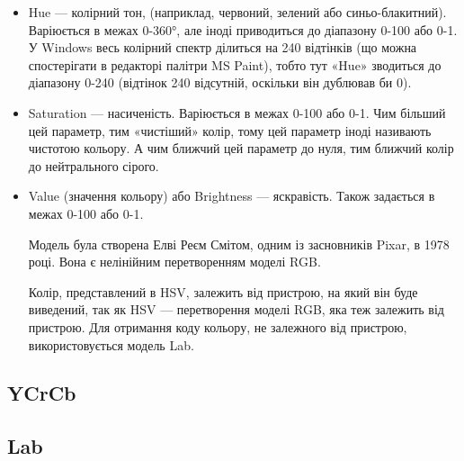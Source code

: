 \begin{itemize}
	\item Hue — колірний тон, (наприклад, червоний, зелений або синьо-блакитний). Варіюється в межах 0-360°, але іноді приводиться до діапазону 0-100 або 0-1. У Windows весь колірний спектр ділиться на 240 відтінків (що можна спостерігати в редакторі палітри MS Paint), тобто тут «Hue» зводиться до діапазону 0-240 (відтінок 240 відсутній, оскільки він дублював би 0).

	\item Saturation — насиченість. Варіюється в межах 0-100 або 0-1. Чим більший цей параметр, тим «чистіший» колір, тому цей параметр іноді називають чистотою кольору. А чим ближчий цей параметр до нуля, тим ближчий колір до нейтрального сірого.
	
	\item Value (значення кольору) або Brightness — яскравість. Також задається в межах 0-100 або 0-1.

Модель була створена Елві Реєм Смітом, одним із засновників Pixar, в 1978 році. Вона є нелінійним перетворенням моделі RGB.

Колір, представлений в HSV, залежить від пристрою, на який він буде виведений, так як HSV — перетворення моделі RGB, яка теж залежить від пристрою. Для отримання коду кольору, не залежного від пристрою, використовується модель Lab.
\end{itemize}

\subsection{YCrCb}
\subsection{Lab}